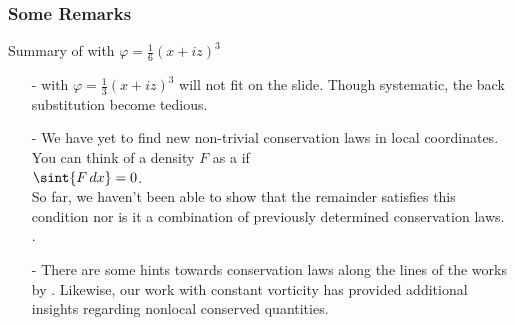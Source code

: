 \begin{frame}[t]\frametitle{Some Remarks}

     Summary of  with $\varphi = \frac{1}{6}(x+iz)^3$
     \vfill
     \pause
    
    \begin{itemize}
        \item[-]  with $\varphi =\frac{1}{3}(x+iz)^3$ will not fit on the slide. Though systematic, the back substitution become tedious.  \pause
        \vfill
        \item[-] We have yet to find new non-trivial conservation laws in local coordinates. You can think of a density $F$ as a  if\\
        \vspace*{.1in}
            \hfill$\displaystyle\sint{F\,dx} = 0$.\hfill ~\\
            \vspace*{.1in}
        \pause So far, we haven't been able to show that the remainder satisfies this condition nor is it a combination of previously determined conservation laws.   .
            \pause
            \vfill
        \item[-] There are some hints towards  conservation laws along the lines of the works by .  Likewise, our work with constant vorticity has provided additional insights regarding nonlocal conserved quantities.
        \vfill
    \end{itemize} 
    \pause

\begin{center}\large{}\normalsize\end{center}
\end{frame}


